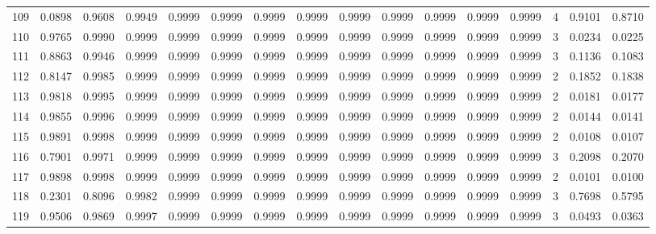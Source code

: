 \begin{tabular}{lrrrrrrrrrrrrrrr}
109 &      0.0898 &  0.9608 &  0.9949 &  0.9999 &  0.9999 &  0.9999 &  0.9999 &  0.9999 &  0.9999 &  0.9999 &   0.9999 &     0.9999 &      4 &                    0.9101 &                     0.8710 \\
110 &      0.9765 &  0.9990 &  0.9999 &  0.9999 &  0.9999 &  0.9999 &  0.9999 &  0.9999 &  0.9999 &  0.9999 &   0.9999 &     0.9999 &      3 &                    0.0234 &                     0.0225 \\
111 &      0.8863 &  0.9946 &  0.9999 &  0.9999 &  0.9999 &  0.9999 &  0.9999 &  0.9999 &  0.9999 &  0.9999 &   0.9999 &     0.9999 &      3 &                    0.1136 &                     0.1083 \\
112 &      0.8147 &  0.9985 &  0.9999 &  0.9999 &  0.9999 &  0.9999 &  0.9999 &  0.9999 &  0.9999 &  0.9999 &   0.9999 &     0.9999 &      2 &                    0.1852 &                     0.1838 \\
113 &      0.9818 &  0.9995 &  0.9999 &  0.9999 &  0.9999 &  0.9999 &  0.9999 &  0.9999 &  0.9999 &  0.9999 &   0.9999 &     0.9999 &      2 &                    0.0181 &                     0.0177 \\
114 &      0.9855 &  0.9996 &  0.9999 &  0.9999 &  0.9999 &  0.9999 &  0.9999 &  0.9999 &  0.9999 &  0.9999 &   0.9999 &     0.9999 &      2 &                    0.0144 &                     0.0141 \\
115 &      0.9891 &  0.9998 &  0.9999 &  0.9999 &  0.9999 &  0.9999 &  0.9999 &  0.9999 &  0.9999 &  0.9999 &   0.9999 &     0.9999 &      2 &                    0.0108 &                     0.0107 \\
116 &      0.7901 &  0.9971 &  0.9999 &  0.9999 &  0.9999 &  0.9999 &  0.9999 &  0.9999 &  0.9999 &  0.9999 &   0.9999 &     0.9999 &      3 &                    0.2098 &                     0.2070 \\
117 &      0.9898 &  0.9998 &  0.9999 &  0.9999 &  0.9999 &  0.9999 &  0.9999 &  0.9999 &  0.9999 &  0.9999 &   0.9999 &     0.9999 &      2 &                    0.0101 &                     0.0100 \\
118 &      0.2301 &  0.8096 &  0.9982 &  0.9999 &  0.9999 &  0.9999 &  0.9999 &  0.9999 &  0.9999 &  0.9999 &   0.9999 &     0.9999 &      3 &                    0.7698 &                     0.5795 \\
119 &      0.9506 &  0.9869 &  0.9997 &  0.9999 &  0.9999 &  0.9999 &  0.9999 &  0.9999 &  0.9999 &  0.9999 &   0.9999 &     0.9999 &      3 &                    0.0493 &                     0.0363 \\

\end{tabular}
